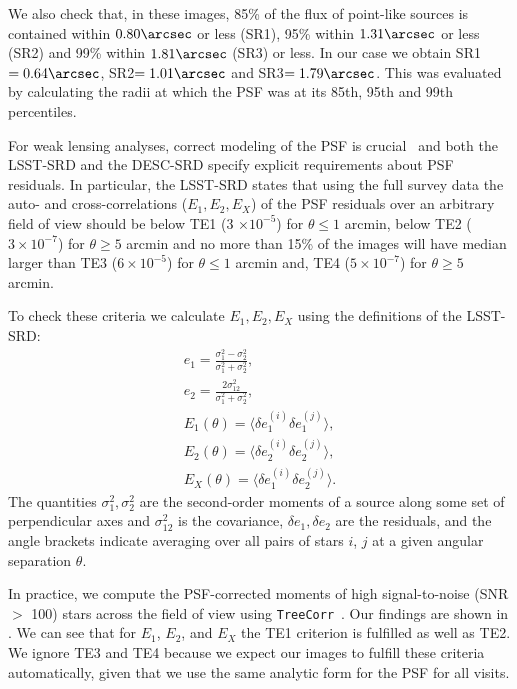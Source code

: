 \documentclass[\docopts]{\docclass}
\begin{document}
We also check that, in these images, 85\% of the flux of point-like sources is contained within $0.80\arcsec$ or less (SR1), 95\% within $1.31\arcsec$ or less (SR2) and 99\% within $1.81\arcsec$ (SR3) or less. In our case we obtain SR1$=0.64\arcsec$, SR2$=1.01\arcsec$ and SR3$=1.79\arcsec$. This was evaluated by calculating the radii at which the PSF was at its 85th, 95th and 99th percentiles.

For weak lensing analyses, correct modeling of the PSF is crucial~\citep{2004MNRAS.353..529H} and both the LSST-SRD and the DESC-SRD specify explicit requirements about PSF residuals. In particular, the LSST-SRD states that using the full survey data the auto- and cross-correlations ($E_{1}, E_{2}, E_{X}$) of the PSF residuals over an arbitrary field of view should be below TE1 (3 $\times 10^{-5}$) for $\theta \leq 1$ arcmin, below TE2 ($3 \times 10^{-7}$) for $\theta \geq 5$ arcmin and no more than 15\% of the images will have median larger than TE3 ($6 \times 10^{-5}$) for $\theta \leq 1$ arcmin and, TE4 ($5 \times 10^{-7}$) for $\theta \geq 5$ arcmin. 

To check these criteria we calculate $E_{1}, E_{2}, E_{X}$ using the definitions of the LSST-SRD:
\begin{eqnarray}
e_{1} = \frac{\sigma^{2}_{1} - \sigma^{2}_{2}}{\sigma_{1}^{2}+\sigma_{2}^{2}},\\
e_{2} = \frac{2\sigma^{2}_{12}}{\sigma_{1}^{2}+\sigma_{2}^{2}},\\
E_{1} (\theta) = \langle \delta e^{(i)}_{1}\delta e^{(j)}_{1} \rangle,\\
E_{2} (\theta) = \langle \delta e^{(i)}_{2}\delta e^{(j)}_{2} \rangle,\\
E_{X} (\theta) = \langle \delta e^{(i)}_{1}\delta e^{(j)}_{2} \rangle.
\end{eqnarray}
The quantities $\sigma_{1}^{2}, \sigma_{2}^{2}$ are the second-order moments of a source along some set of perpendicular axes and $\sigma^{2}_{12}$ is the covariance, $\delta e_{1}, \delta e_{2}$ are the residuals, and the angle brackets indicate averaging over all pairs of stars $i$, $j$ at a given angular separation $\theta$.

In practice, we compute the PSF-corrected moments of high signal-to-noise (SNR $>$ 100) stars across the field of view using \texttt{TreeCorr}~\citep{2004MNRAS.352..338J}. Our findings are shown in . We can see that for $E_{1}$, $E_{2}$, and $E_{X}$ the TE1 criterion is fulfilled as well as TE2. We ignore TE3 and TE4 because we expect our images to fulfill these criteria automatically, given that we use the same analytic form for the PSF for all visits. 
\end{document}
